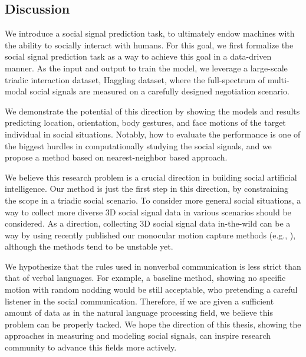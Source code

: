 





\subsection{Discussion}
We introduce a social signal prediction task, to ultimately endow machines with the ability to socially interact with humans. For this goal, we first formalize the social signal prediction task as a way to achieve this goal in a data-driven manner. As the input and output to train the model, we leverage a large-scale triadic interaction dataset, Haggling dataset, where the full-spectrum of multi-modal social signals are measured on a carefully designed negotiation scenario.

We demonstrate the potential of this direction by showing the models and results predicting location, orientation, body gestures, and face motions of the target individual in social situations. Notably, how to evaluate the performance is one of the biggest hurdles in computationally studying the social signals, and we propose a method based on nearest-neighbor based approach. 

We believe this research problem is a crucial direction in building social artificial intelligence. Our method is just the first step in this direction, by constraining the scope in a triadic social scenario. To consider more general social situations, a way to collect more diverse 3D social signal data in various scenarios should be considered. As a direction, collecting 3D social signal data in-the-wild can be a way by using recently published our monocular motion capture methods (e.g., \cite{Xiang2019}), although the methods tend to be unstable yet.

We hypothesize that the rules used in nonverbal communication is less strict than that of verbal languages. For example, a baseline method, showing no specific motion with random nodding would be still acceptable, who pretending a careful listener in the social communication. Therefore, if we are given a sufficient amount of data as in the natural language processing field, we believe this problem can be properly tacked. We hope the direction of this thesis, showing the approaches in measuring and modeling social signals, can inspire research community to advance this fields more actively. 



